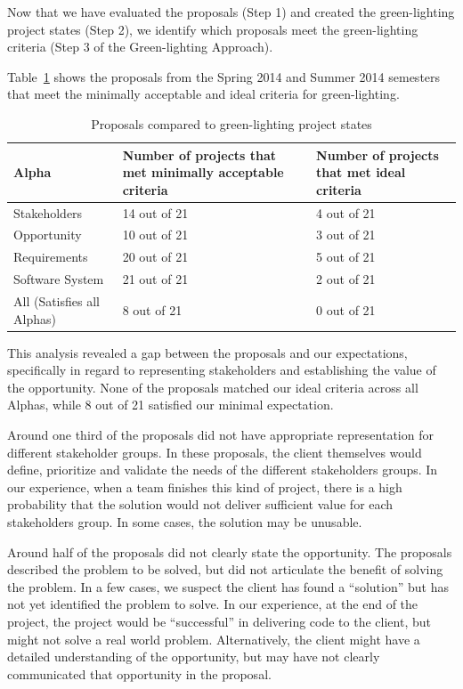 Now that we have evaluated the proposals (Step 1) and created the
green-lighting project states (Step 2), we identify which proposals
meet the green-lighting criteria (Step 3 of the Green-lighting Approach). 

Table~\ref{table_proposal_evaluations} shows the proposals from the Spring 2014 and Summer 2014 semesters that meet the minimally acceptable and ideal criteria for green-lighting. 

\begin{table}
\renewcommand{\arraystretch}{1.3}
\caption{Proposals compared to green-lighting project states}
\label{table_proposal_evaluations}
\begin{tabular}{|p{1.10in}|p{0.95in}|p{0.95in}|}
\hline
Alpha & Number of projects that met minimally acceptable criteria & Number of projects that met ideal criteria \\ \hline
Stakeholders & 14 out of 21 & 4 out of 21 \\ \hline
Opportunity & 10 out of 21 & 3 out of 21 \\ \hline
Requirements & 20 out of 21 & 5 out of 21 \\ \hline
Software System & 21 out of 21 & 2 out of 21 \\ \hline
All (Satisfies all Alphas) & 8 out of 21 & 0 out of 21 \\ \hline
\end{tabular}
\end{table}

This analysis revealed a gap between the proposals and our
expectations, specifically in regard to representing stakeholders and
establishing the value of the opportunity. None of the proposals matched our ideal criteria across all Alphas, while 8 out of 21 satisfied our minimal expectation.

Around one third of the proposals did not have appropriate
representation for different stakeholder groups. In these proposals, the
client themselves would define, prioritize and validate the needs of the
different stakeholders groups. In our experience, when a team finishes
this kind of project, there is a high probability that the solution
would not deliver sufficient value for each stakeholders group. In some
cases, the solution may be unusable.

Around half of the proposals did not clearly state the
opportunity. The proposals described the problem to be solved, but did
not articulate the benefit of solving the problem. In a few cases, we
suspect the client has found a ``solution'' but has not yet identified
the problem to solve. In our experience, at the end of the project,
the project would be ``successful'' in delivering code to the client,
but might not solve a real world problem. Alternatively, the client
might have a detailed understanding of the opportunity, but may have not
clearly communicated that opportunity in the proposal.

